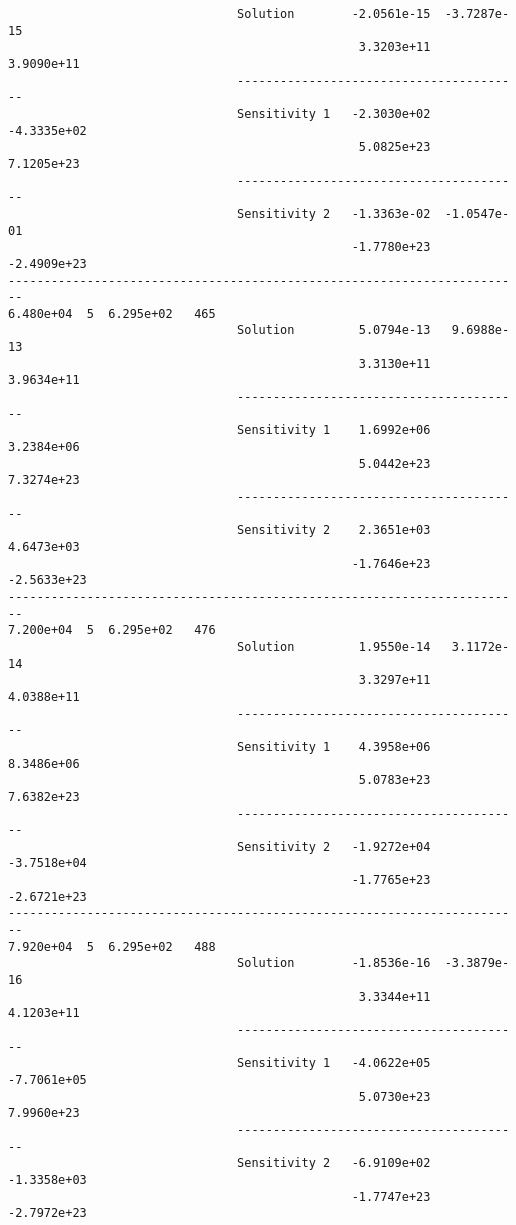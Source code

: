 \begin{verbatim}
                                Solution        -2.0561e-15  -3.7287e-15 
                                                 3.3203e+11   3.9090e+11 
                                ----------------------------------------
                                Sensitivity 1   -2.3030e+02  -4.3335e+02 
                                                 5.0825e+23   7.1205e+23 
                                ----------------------------------------
                                Sensitivity 2   -1.3363e-02  -1.0547e-01 
                                                -1.7780e+23  -2.4909e+23 
------------------------------------------------------------------------
6.480e+04  5  6.295e+02   465
                                Solution         5.0794e-13   9.6988e-13 
                                                 3.3130e+11   3.9634e+11 
                                ----------------------------------------
                                Sensitivity 1    1.6992e+06   3.2384e+06 
                                                 5.0442e+23   7.3274e+23 
                                ----------------------------------------
                                Sensitivity 2    2.3651e+03   4.6473e+03 
                                                -1.7646e+23  -2.5633e+23 
------------------------------------------------------------------------
7.200e+04  5  6.295e+02   476
                                Solution         1.9550e-14   3.1172e-14 
                                                 3.3297e+11   4.0388e+11 
                                ----------------------------------------
                                Sensitivity 1    4.3958e+06   8.3486e+06 
                                                 5.0783e+23   7.6382e+23 
                                ----------------------------------------
                                Sensitivity 2   -1.9272e+04  -3.7518e+04 
                                                -1.7765e+23  -2.6721e+23 
------------------------------------------------------------------------
7.920e+04  5  6.295e+02   488
                                Solution        -1.8536e-16  -3.3879e-16 
                                                 3.3344e+11   4.1203e+11 
                                ----------------------------------------
                                Sensitivity 1   -4.0622e+05  -7.7061e+05 
                                                 5.0730e+23   7.9960e+23 
                                ----------------------------------------
                                Sensitivity 2   -6.9109e+02  -1.3358e+03 
                                                -1.7747e+23  -2.7972e+23 

\end{verbatim}
